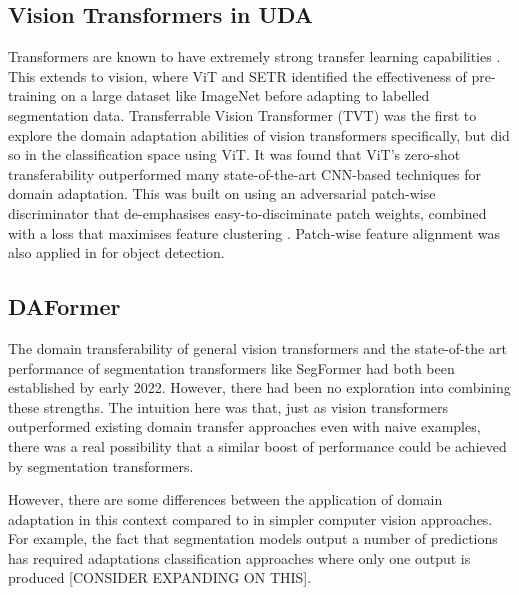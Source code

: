 \documentclass[a4paper,12pt]{report}
\begin{document}
\subsection*{Vision Transformers in UDA}

Transformers are known to have extremely strong transfer learning capabilities \cite{radford_language_2019} \cite{wright_transformer_2020}. This extends to vision, where ViT \cite{dosovitskiy_image_2021} and SETR \cite{zheng_rethinking_2021} identified the effectiveness of pre-training on a large dataset like ImageNet before adapting to labelled segmentation data. Transferrable Vision Transformer (TVT) \cite{yang_tvt_2021} was the first to explore the domain adaptation abilities of vision transformers specifically, but did so in the classification space using ViT. It was found that ViT's zero-shot transferability outperformed many state-of-the-art CNN-based techniques for domain adaptation. This was built on using an adversarial patch-wise discriminator that de-emphasises easy-to-disciminate patch weights, combined with a loss that maximises feature clustering \cite{chapelle_semi-supervised_2005}. Patch-wise feature alignment was also applied in \cite{wang_exploring_2021} for object detection.

\subsection*{DAFormer}

The domain transferability of general vision transformers and the state-of-the art performance of segmentation transformers like SegFormer had both been established by early 2022. However, there had been no exploration into combining these strengths.
The intuition here was that, just as vision transformers outperformed existing domain transfer approaches even with naive examples, there was a real possibility that a similar boost of performance could be achieved by segmentation transformers.

However, there are some differences between the application of domain adaptation in this context compared to in simpler computer vision approaches. For example, the fact that segmentation models output a number of predictions has required adaptations classification approaches where only one output is produced [CONSIDER EXPANDING ON THIS].
\end{document}
